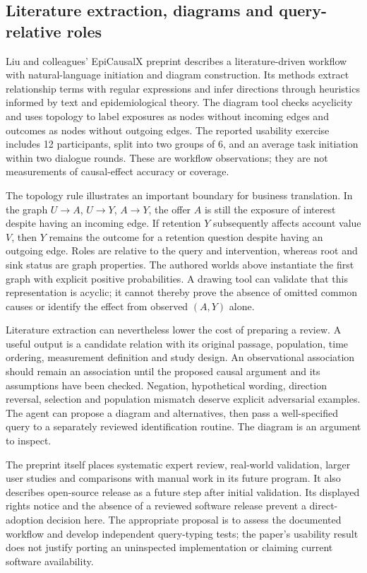 \subsection{Literature extraction, diagrams and query-relative roles}

Liu and colleagues' EpiCausalX preprint describes a literature-driven
workflow with natural-language initiation and diagram construction. Its
methods extract relationship terms with regular expressions and infer
directions through heuristics informed by text and epidemiological theory.
The diagram tool checks acyclicity and uses topology to label exposures as
nodes without incoming edges and outcomes as nodes without outgoing edges.
The reported usability exercise includes 12 participants, split into two
groups of 6, and an average task initiation within two dialogue rounds.
These are workflow observations; they are not measurements of causal-effect
accuracy or coverage.~\citep{exec17_frontier_liu}

The topology rule illustrates an important boundary for business translation.
In the graph $U\to A$, $U\to Y$, $A\to Y$, the offer $A$ is still the
exposure of interest despite having an incoming edge. If retention $Y$
subsequently affects account value $V$, then $Y$ remains the outcome for a
retention question despite having an outgoing edge. Roles are relative to
the query and intervention, whereas root and sink status are graph
properties. The authored worlds above instantiate the first graph with
explicit positive probabilities. A drawing tool can validate that this
representation is acyclic; it cannot thereby prove the absence of omitted
common causes or identify the effect from observed $(A,Y)$ alone.
\citep{exec17_frontier_exact}

Literature extraction can nevertheless lower the cost of preparing a review.
A useful output is a candidate relation with its original passage, population,
time ordering, measurement definition and study design. An observational
association should remain an association until the proposed causal argument
and its assumptions have been checked. Negation, hypothetical wording,
direction reversal, selection and population mismatch deserve explicit
adversarial examples. The agent can propose a diagram and alternatives, then
pass a well-specified query to a separately reviewed identification routine.
The diagram is an argument to inspect.

The preprint itself places systematic expert review, real-world validation,
larger user studies and comparisons with manual work in its future program.
It also describes open-source release as a future step after initial
validation. Its displayed rights notice and the absence of a reviewed
software release prevent a direct-adoption decision here. The appropriate
proposal is to assess the documented workflow and develop independent
query-typing tests; the paper's usability result does not justify porting an
uninspected implementation or claiming current software availability.
\citep{exec17_frontier_liu}


